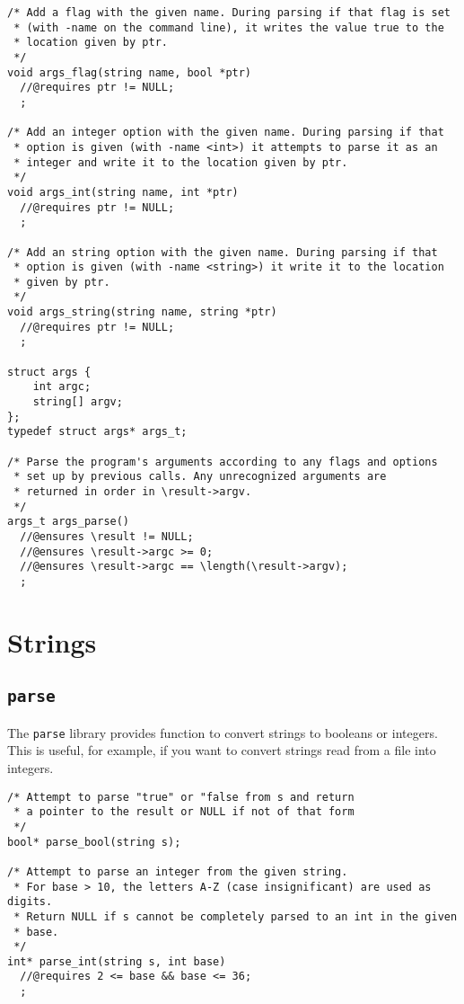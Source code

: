 \documentclass[11pt]{article}
\renewcommand{\_}{\char`\_}
\renewcommand{\{}{\char`\{}
\renewcommand{\}}{\char`\}}
\begin{document}
\begin{small}
\begin{verbatim}
/* Add a flag with the given name. During parsing if that flag is set
 * (with -name on the command line), it writes the value true to the
 * location given by ptr.
 */
void args_flag(string name, bool *ptr)
  //@requires ptr != NULL;
  ;

/* Add an integer option with the given name. During parsing if that
 * option is given (with -name <int>) it attempts to parse it as an
 * integer and write it to the location given by ptr.
 */
void args_int(string name, int *ptr)
  //@requires ptr != NULL;
  ;

/* Add an string option with the given name. During parsing if that
 * option is given (with -name <string>) it write it to the location
 * given by ptr.
 */
void args_string(string name, string *ptr)
  //@requires ptr != NULL;
  ;

struct args {
    int argc;
    string[] argv;
};
typedef struct args* args_t;

/* Parse the program's arguments according to any flags and options
 * set up by previous calls. Any unrecognized arguments are
 * returned in order in \result->argv.
 */
args_t args_parse()
  //@ensures \result != NULL;
  //@ensures \result->argc >= 0;
  //@ensures \result->argc == \length(\result->argv);
  ;
\end{verbatim}
\end{small}

\section{Strings}

\subsection{\tt parse}

The \verb'parse' library provides function to convert
strings to booleans or integers.  This is useful, for
example, if you want to convert strings read from a
file into integers.

\begin{small}
\begin{verbatim}
/* Attempt to parse "true" or "false from s and return
 * a pointer to the result or NULL if not of that form
 */
bool* parse_bool(string s);

/* Attempt to parse an integer from the given string.
 * For base > 10, the letters A-Z (case insignificant) are used as digits.
 * Return NULL if s cannot be completely parsed to an int in the given
 * base.
 */
int* parse_int(string s, int base)
  //@requires 2 <= base && base <= 36;
  ;
\end{verbatim}
\end{small}
\end{document}
